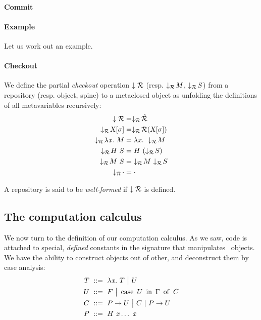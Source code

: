 \documentclass[9pt]{sigplanconf}
\newtheorem{theorem}{Theorem}
\begin{document}
\paragraph{Commit}

\paragraph{Example}

Let us work out an example.

\paragraph{Checkout}

We define the partial \emph{checkout} operation $\downarrow{\mathcal{R}}$
(resp. $\downarrow_{\mathcal{R}}\!{M}$, $\downarrow_{\mathcal{R}}\!{S}$) from a repository
(resp. object, spine) to a metaclosed object as unfolding the
definitions of all metavariables recursively:
\begin{align*}
  \checkout{\mr} &= \checkoutr{\hat{\mr}} \\
  \checkoutr{\smeta X \sigma} &= \checkoutr{\mr(\smeta X\sigma)}\\
  \checkoutr{\lam x M} &= \lam x \checkoutr{M} \\
  \checkoutr{\app H S} &= \app H {(\checkoutr{S})} \\
  \checkoutr{\spinecons M S} &= \spinecons {\checkoutr M} {\checkoutr S} \\
  \checkoutr{\spinenil} &= \spinenil
\end{align*}

A repository is said to be \emph{well-formed} if $\downarrow{\mathcal{R}}$
is defined.



\subsection{The computation calculus}
\label{sec:computational-calculus}

We now turn to the definition of our computation calculus. As we saw,
code is attached to special, \emph{defined} constants in the signature
that manipulates \LF\ objects. We have the ability to construct
objects out of other, and deconstruct them by case analysis:
\begin{align*}
  T &\ ::=\ 
  \lambda{\ensuremath{\text{\textit{x}}}}.\  T \ {\big|}\ 
  U \\
  U &\ ::=\ 
  F \ {\big|}\ 
  \operatorname{case}\ {{U}\ \operatorname{in}\ {\Gamma}}\ \operatorname{of}\  C \\
  C &\ ::=\  {P}\to U \ {\big|}\ 
  C\ |\ {P}\to U \\
  P &\ ::=\ 
  {H}\  {\text{\textit{x}}} \ldots\ {\text{\textit{x}}}
\end{align*}
\end{document}
